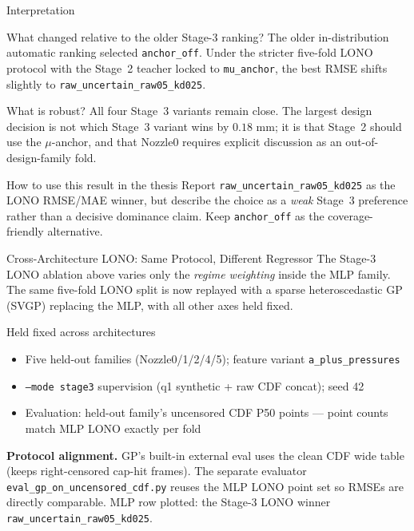 \documentclass[UTF8,aspectratio=169]{ctexbeamer}
\begin{document}
\begin{frame}{Interpretation}
\small
\begin{block}{What changed relative to the older Stage-3 ranking?}
The older in-distribution automatic ranking selected \texttt{anchor\_off}. Under the stricter
five-fold LONO protocol with the Stage~2 teacher locked to \texttt{mu\_anchor}, the best RMSE
shifts slightly to \texttt{raw\_uncertain\_raw05\_kd025}.
\end{block}

\begin{block}{What is robust?}
All four Stage~3 variants remain close. The largest design decision is not which Stage~3
variant wins by \(0.18\) mm; it is that Stage~2 should use the \(\mu\)-anchor, and that Nozzle0
requires explicit discussion as an out-of-design-family fold.
\end{block}

\begin{block}{How to use this result in the thesis}
Report \texttt{raw\_uncertain\_raw05\_kd025} as the LONO RMSE/MAE winner, but describe the
choice as a \emph{weak} Stage~3 preference rather than a decisive dominance claim. Keep
\texttt{anchor\_off} as the coverage-friendly alternative.
\end{block}
\end{frame}

\begin{frame}{Cross-Architecture LONO: Same Protocol, Different Regressor}
\small
The Stage-3 LONO ablation above varies only the \emph{regime weighting} inside the MLP family.
The same five-fold LONO split is now replayed with a sparse heteroscedastic GP (SVGP) replacing
the MLP, with all other axes held fixed.

\vspace{0.4em}
\begin{block}{Held fixed across architectures}
\begin{itemize}\setlength\itemsep{2pt}
  \item Five held-out families (Nozzle0/1/2/4/5); feature variant \texttt{a\_plus\_pressures}
  \item \texttt{--mode stage3} supervision (q1 synthetic + raw CDF concat); seed 42
  \item Evaluation: held-out family's uncensored CDF P50 points
        --- point counts match MLP LONO exactly per fold
\end{itemize}
\end{block}

\vspace{0.3em}
\textbf{Protocol alignment.} GP's built-in external eval uses the clean CDF wide table
(keeps right-censored cap-hit frames). The separate evaluator
\texttt{eval\_gp\_on\_uncensored\_cdf.py} reuses the MLP LONO point set so RMSEs are directly
comparable. MLP row plotted: the Stage-3 LONO winner \texttt{raw\_uncertain\_raw05\_kd025}.
\end{frame}
\end{document}
